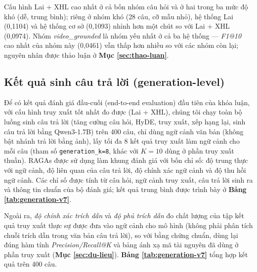 \bigbreak\noindent
Cấu hình Lai + XHL cao nhất ở cả bốn nhóm câu hỏi và ở hai trong ba mức độ khó (dễ, trung bình); riêng ở nhóm khó (28 câu, cỡ mẫu nhỏ), hệ thống Lai (0,1104) và hệ thống cơ sở (0,1093) nhỉnh hơn một chút so với Lai + XHL (0,0974). Nhóm \textit{video\_grounded} là nhóm yếu nhất ở cả ba hệ thống — \textit{F1@10} cao nhất của nhóm này (0,0461) vẫn thấp hơn nhiều so với các nhóm còn lại; nguyên nhân được thảo luận ở \textbf{Mục \ref{sec:thao-luan}}.

\subsection{Kết quả sinh câu trả lời (generation-level)}\label{sec:ket-qua-sinh}

Để có kết quả đánh giá đầu-cuối (end-to-end evaluation) đầu tiên của khóa luận, với cấu hình truy xuất tốt nhất đo được (Lai + XHL), chúng tôi chạy toàn bộ luồng sinh câu trả lời (tăng cường câu hỏi, HyDE, truy xuất, xếp hạng lại, sinh câu trả lời bằng Qwen3-1.7B) trên 400 câu, chỉ dùng ngữ cảnh văn bản (không bật nhánh trả lời bằng ảnh), lấy tối đa 8 kết quả truy xuất làm ngữ cảnh cho mỗi câu (tham số \texttt{generation\_k=8}, khác với $K = 10$ dùng ở phần truy xuất thuần). RAGAs được sử dụng làm khung đánh giá với bốn chỉ số: độ trung thực với ngữ cảnh, độ liên quan của câu trả lời, độ chính xác ngữ cảnh và độ thu hồi ngữ cảnh. Các chỉ số được tính từ câu hỏi, ngữ cảnh truy xuất, câu trả lời sinh ra và thông tin chuẩn của bộ đánh giá; kết quả trung bình được trình bày ở \textbf{Bảng \ref{tab:generation-v7}}.

\bigbreak\noindent
Ngoài ra, \textit{độ chính xác trích dẫn} và \textit{độ phủ trích dẫn} đo chất lượng của tập kết quả truy xuất thực sự được đưa vào ngữ cảnh cho mô hình (không phải phân tích chuỗi trích dẫn trong văn bản câu trả lời), so với bằng chứng chuẩn, dùng lại đúng hàm tính \textit{Precision/Recall@K} và bảng ánh xạ mã tài nguyên đã dùng ở phần truy xuất (\textbf{Mục \ref{sec:du-lieu}}). \textbf{Bảng \ref{tab:generation-v7}} tổng hợp kết quả trên 400 câu.

